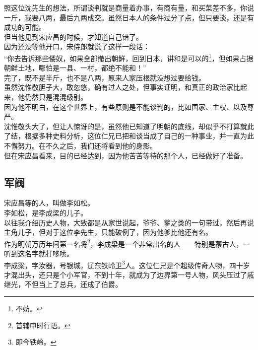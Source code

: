 \begin{multicols}{\theparacolNo}
照这位沈先生的想法，所谓谈判就是商量着办事，有商有量，和买菜差不多，你说一斤，我要八两，最后九两成交。虽然日本人的条件过分了点，但只要谈，还是有成功的可能。\\

但当他见到宋应昌的时候，才知道自己错了。\\

因为还没等他开口，宋侍郎就说了这样一段话：\\

“你去告诉那些倭奴，如果全部撤出朝鲜，回到日本，讲和是可以的\footnote{不妨。}，但如果占据朝鲜土地，哪怕是一县、一村，都绝不能和！”\\

完了，既不是半斤，也不是八两，原来人家压根就没想过要给钱。\\

虽然沈惟敬胆子大，敢忽悠，确有过人之处，但事实证明，和真正的政治家比起来，他仍然只是混混级别。\\

因为他不明白，在这个世界上，有些原则是不能谈判的，比如国家、主权、以及尊严。\\

沈惟敬头大了，但让人惊讶的是，虽然他已知道了明朝的底线，却似乎不打算就此了结，根据多种史料分析，这位仁兄已把和谈当成了自己的一种事业，并一直为此不懈努力。在不久之后，我们还将看到他的身影。\\

但在宋应昌看来，目的已经达到，因为他苦苦等待的那个人，已经做好了准备。\\

\subsection{军阀}
宋应昌等的人，叫做李如松。\\

李如松，是李成梁的儿子。\\

以往我介绍历史人物，大致都是从家世说起，爷爷、爹之类的一句带过，然后再说主角儿子，但对于这位李先生，只能破例了，因为他爹比他还有名。\\

作为明朝万历年间第一名将\footnote{首辅申时行语。}，李成梁是一个非常出名的人——特别是蒙古人，一听到这名字就打哆嗦。\\

李成梁，字汝器，号银城，辽东铁岭卫\footnote{即今铁岭。}人。这位仁兄是个超级传奇人物，四十岁才混出头，还只是个小军官，不到十年，就成为了边界第一号人物，风头压过了戚继光，不但当上了总兵，还成了伯爵。\\


\end{multicols}
